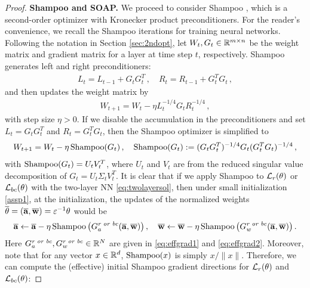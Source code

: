 \begin{proof}
\noindent 
{\bf Shampoo and SOAP.} We proceed to consider Shampoo \cite{gupta2018shampoo}, which is a second-order optimizer with 
Kronecker product preconditioners. 
For the reader's convenience, we recall the Shampoo iterations for training neural networks. Following the notation in Section \ref{sec:2ndopt}, let $W_t, G_t \in \mathbb{R}^{m \times n}$ be the weight matrix and gradient matrix for a layer at time step $t$, respectively. Shampoo generates left and right preconditioners: 
\begin{align*}
    L_t = L_{t - 1} + G_t G_t^T\,, \quad R_t = R_{t - 1} + G_t^T G_t\,,
\end{align*}
and then updates the weight matrix by 
\begin{align*}
    W_{t + 1} = W_t - \eta L_t^{-1/4} G_t R_t^{-1/4}\,,
\end{align*}
with step size $\eta > 0$. If we disable the accumulation in the preconditioners and set $ L_t =  G_t G_t^T$ and $R_t = G_t^T G_t$, then the Shampoo optimizer is simplified to
\begin{align*}
    W_{t + 1} = W_t - \eta\, {\rm Shampoo}(G_t)\,, \quad {\rm Shampoo}(G_t): = (G_t G_t^T)^{-1/4} G_t (G_t^T G_t)^{-1/4}\,,
\end{align*}
with ${\rm Shampoo}(G_t) = U_t V_t^T$, where $U_t$ and $V_t$ are from the reduced singular value decomposition of $G_t = U_t \Sigma_t V_t^T$. It is clear that if we apply Shampoo to $\mathcal{L}_r(\theta)$ or $\mathcal{L}_{bc}(\theta)$ with the two-layer NN \eqref{eq:twolayersol}, then under small initialization \cref{assp1}, at the initialization, the updates of the normalized weights $\overline{\theta} = (\overline{\mathbf{a}},\overline{\mathbf{w}}) = \varepsilon^{-1} \theta$ would be 
\begin{align*}
   \overline{\mathbf{a}} \leftarrow \overline{\mathbf{a}} - \eta \, {\rm Shampoo}\left(G_a^{\textit{r or bc}}(\overline{\mathbf{a}},\overline{\mathbf{w}})\right),\quad   \overline{\mathbf{w}} \leftarrow \overline{\mathbf{w}} - \eta \, {\rm Shampoo}\left(G_w^{\textit{r or bc}}(\overline{\mathbf{a}},\overline{\mathbf{w}})\right).
\end{align*}
Here $G_a^{\textit{r or bc}}, G_w^{\textit{r or bc}} \in \mathbb{R}^N$ are given in \eqref{eq:effgrad1} and \eqref{eq:effgrad2}. Moreover, note that for any vector $x \in \mathbb{R}^d$, ${\rm Shampoo}(x)$ is simply $x/\|x\|$. Therefore, we can compute the (effective) initial Shampoo gradient directions for $\mathcal{L}_r(\theta)$ and $\mathcal{L}_{bc}(\theta)$:

\end{proof}
